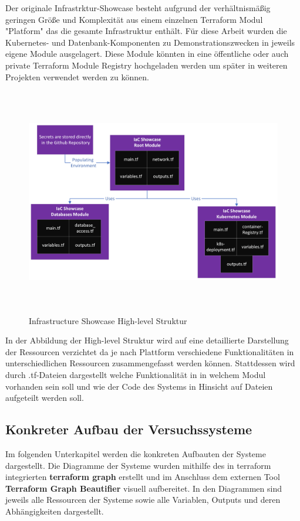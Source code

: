 \begin{spacing}{1.2}
Der originale Infrastrktur-Showcase besteht aufgrund der verhältnismäßig
geringen Größe und Komplexität aus einem einzelnen Terraform Modul
"Platform" das die gesamte Infrastruktur enthält. Für diese Arbeit wurden
die Kubernetes- und Datenbank-Komponenten zu Demonstrationszwecken in
jeweils eigene Module ausgelagert. Diese Module könnten in
eine öffentliche oder auch private Terraform Module Registry
hochgeladen werden um später in weiteren Projekten verwendet werden zu
können.

\begin{figure}[H]
  \includegraphics[keepaspectratio, height=10cm]{fig/hauptteil/IaC_Showcase_Structure_High-level.png}
  \caption{Infrastructure Showcase High-level Struktur}
  \centering
\end{figure}

In der Abbildung der High-level Struktur wird auf eine detaillierte
Darstellung der Ressourcen verzichtet da je nach Plattform verschiedene
Funktionalitäten in unterschiedlichen Ressourcen zusammengefasst werden
können. Stattdessen wird durch .tf-Dateien dargestellt welche
Funktionalität in in welchem Modul vorhanden sein soll und wie der Code
des Systems in Hinsicht auf Dateien aufgeteilt werden soll.

\subsection{Konkreter Aufbau der Versuchssysteme}

Im folgenden Unterkapitel werden die konkreten Aufbauten der Systeme
dargestellt. Die Diagramme der Systeme wurden mithilfe des in
terraform integrierten \textbf{terraform graph} erstellt und im
Anschluss dem externen Tool \textbf{Terraform Graph Beautifier}
visuell aufbereitet. In den Diagrammen sind jeweils alle Ressourcen
der Systeme sowie alle Variablen, Outputs und deren Abhängigkeiten
dargestellt.


\end{spacing}
